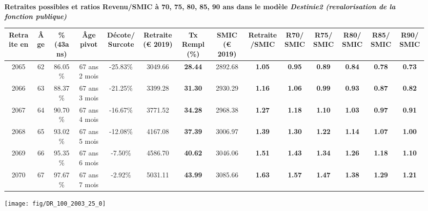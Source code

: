  \vspace{0.1cm} 
{\bf \noindent Retraites possibles et ratios Revenu/SMIC à 70, 75, 80, 85, 90 ans dans le modèle \emph{Destinie2 (revalorisation de la fonction publique)}}  
 
\begin{adjustbox}{max width=\textwidth} 
\begin{tabular}[htb]{|c|c||c|c|c||c|c||c|c||c|c|c|c|c|} 
\hline 
 Retraite en &  Âge &  \%(43ans) &  Âge pivot &  Décote/Surcote &  Retraite (\euro{} 2019) &  Tx Rempl(\%) &  SMIC (\euro{} 2019) &  Retraite/SMIC &  R70/SMIC &  R75/SMIC &  R80/SMIC &  R85/SMIC &  R90/SMIC \\ 
\hline \hline 
 2065 &  62 &  86.05\% &  67 ans 2 mois &  -25.83\% &  3049.66 &  {\bf 28.44} &  2892.68 &  {\bf 1.05} &  {\bf {\color{red} 0.95}} &  {\bf {\color{red} 0.89}} &  {\bf {\color{red} 0.84}} &  {\bf {\color{red} 0.78}} &  {\bf {\color{red} 0.73}} \\ 
\hline 
 2066 &  63 &  88.37\% &  67 ans 3 mois &  -21.25\% &  3399.28 &  {\bf 31.30} &  2930.29 &  {\bf 1.16} &  {\bf 1.06} &  {\bf {\color{red} 0.99}} &  {\bf {\color{red} 0.93}} &  {\bf {\color{red} 0.87}} &  {\bf {\color{red} 0.82}} \\ 
\hline 
 2067 &  64 &  90.70\% &  67 ans 4 mois &  -16.67\% &  3771.52 &  {\bf 34.28} &  2968.38 &  {\bf 1.27} &  {\bf 1.18} &  {\bf 1.10} &  {\bf 1.03} &  {\bf {\color{red} 0.97}} &  {\bf {\color{red} 0.91}} \\ 
\hline 
 2068 &  65 &  93.02\% &  67 ans 5 mois &  -12.08\% &  4167.08 &  {\bf 37.39} &  3006.97 &  {\bf 1.39} &  {\bf 1.30} &  {\bf 1.22} &  {\bf 1.14} &  {\bf 1.07} &  {\bf 1.00} \\ 
\hline 
 2069 &  66 &  95.35\% &  67 ans 6 mois &  -7.50\% &  4586.70 &  {\bf 40.62} &  3046.06 &  {\bf 1.51} &  {\bf 1.43} &  {\bf 1.34} &  {\bf 1.26} &  {\bf 1.18} &  {\bf 1.10} \\ 
\hline 
 2070 &  67 &  97.67\% &  67 ans 7 mois &  -2.92\% &  5031.11 &  {\bf 43.99} &  3085.66 &  {\bf 1.63} &  {\bf 1.57} &  {\bf 1.47} &  {\bf 1.38} &  {\bf 1.29} &  {\bf 1.21} \\ 
\hline 
\hline 
\end{tabular} 
\end{adjustbox} 
 
 \vspace{0.1cm} 

 {\hspace{-2.2cm}\texttt{[image: fig/DR\_100\_2003\_25\_0]}} 

